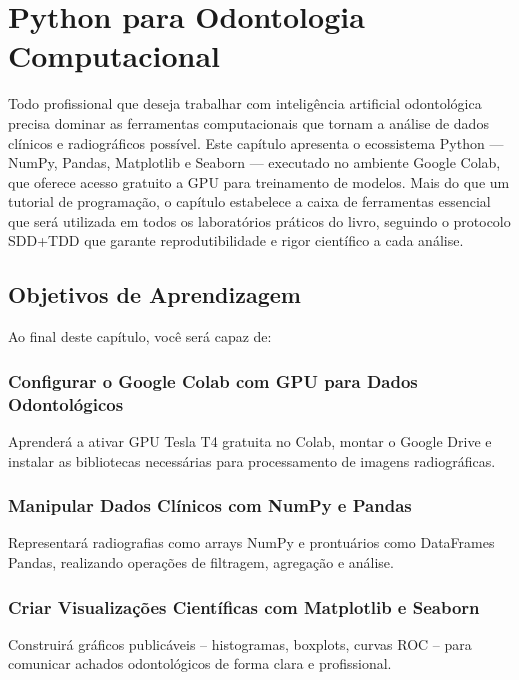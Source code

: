 
\chapter{Python para Odontologia Computacional}
\label{cap:python-colab}

\nivelzero

Todo profissional que deseja trabalhar com inteligência artificial odontológica precisa dominar as ferramentas computacionais que tornam a análise de dados clínicos e radiográficos possível. Este capítulo apresenta o ecossistema Python — NumPy, Pandas, Matplotlib e Seaborn — executado no ambiente Google Colab, que oferece acesso gratuito a GPU para treinamento de modelos. Mais do que um tutorial de programação, o capítulo estabelece a caixa de ferramentas essencial que será utilizada em todos os laboratórios práticos do livro, seguindo o protocolo SDD+TDD que garante reprodutibilidade e rigor científico a cada análise.

\section{Objetivos de Aprendizagem}

Ao final deste capítulo, você será capaz de:

\subsection{Configurar o Google Colab com GPU para Dados Odontológicos}
Aprenderá a ativar GPU Tesla T4 gratuita no Colab, montar o Google Drive e instalar as bibliotecas necessárias para processamento de imagens radiográficas.

\subsection{Manipular Dados Clínicos com NumPy e Pandas}
Representará radiografias como arrays NumPy e prontuários como DataFrames Pandas, realizando operações de filtragem, agregação e análise.

\subsection{Criar Visualizações Científicas com Matplotlib e Seaborn}
Construirá gráficos publicáveis -- histogramas, boxplots, curvas ROC -- para comunicar achados odontológicos de forma clara e profissional.

